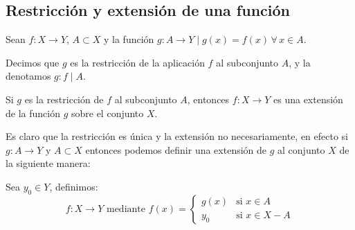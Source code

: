 \subsection{Restricción y extensión de una función} \label{sec:restr}
\vspace{3mm}  
\begin{fmd-definition}
	Sean $f:X \rightarrow Y$, $A \subset X$ y la función $g: A \rightarrow Y \mid 
	g(x) = f(x) \, \forall \, x \in A$.
	
	Decimos que $g$ es la restricción de la aplicación $f$ al subconjunto $A$, y
	la denotamos $g:f \mid A$.
\end{fmd-definition}

\begin{fmd-definition}  
	Si $g$ es la restricción de $f$ al subconjunto $A$, entonces $f: X \rightarrow
	Y$ es una extensión de la función $g$ sobre el conjunto $X$.
\end{fmd-definition}
Es claro que la restricción es única y la extensión no necesariamente, en efecto 
si $g: A \rightarrow Y$ y $A \subset X$ entonces podemos definir una extensión de
$g$ al conjunto $X$ de la siguiente manera:

Sea $y_0 \in Y$, definimos: 
\[ f: X \rightarrow Y \mbox{ mediante } f(x) = \begin{cases}
	g(x) & \mbox{si } x \in A\\
	y_0 & \mbox{si } x \in X - A
\end{cases} \]